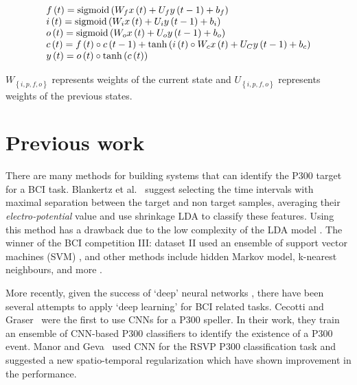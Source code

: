 \documentclass[
12pt, %
english, %
doublespacing, %
headsepline, %
]{MastersDoctoralThesis} %
\begin{document}
\begin{equation} \label{eq_lstm}
\begin{array}{l}
f\left( t \right) = {\rm{sigmoid}}\left( {{W_f}x\left( t \right) + {U_f}y\left( {t - 1} \right) + {b_f}} \right)\\
i\left( t \right) = {\rm{sigmoid}}\left( {{W_i}x\left( t \right) + {U_i}y\left( {t - 1} \right) + {b_i}} \right)\\
o\left( t \right) = {\rm{sigmoid}}\left( {{W_o}x\left( t \right) + {U_o}y\left( {t - 1} \right) + {b_o}} \right)\\
c\left( t \right) = f\left( t \right) \circ c\left( {t - 1} \right) + \tanh \left( {i\left( t \right) \circ {W_c}x\left( t \right) + {U_C}y\left( {t - 1} \right) + {b_c}} \right)\\
y\left( t \right) = o\left( t \right) \circ \tanh \left( {c\left( t \right)} \right)
\end{array}
\end{equation}

${W_{\left\{ {i,p,f,o} \right\}}}$ represents weights of the current state and  ${U_{\left\{ {i,p,f,o} \right\}}}$ represents weights of the previous states. 


\chapter{Previous work}
There are many methods for building systems that can identify the P300 target for a BCI task. Blankertz et al.~\cite{P300_Tutorial} suggest 
selecting the time intervals with maximal separation between the target and non target samples, averaging their \textit{electro-potential} value and use shrinkage LDA to classify these features. Using this method has a drawback due to the low complexity of the LDA model \cite{cincotti2003comparison}. The winner of the BCI competition III: dataset II used an ensemble of support vector machines (SVM) \cite{P300SVMWinner}, and other methods include hidden Markov model, k-nearest neighbours, and more  \cite{cincotti2003comparison}.

More recently, given the success of `deep' neural networks \cite{krizhevsky2012imagenet}, there have been several attempts to apply `deep learning' for BCI related tasks. Cecotti and Graser~\cite{P300_CNN} were the first to use CNNs  for a P300 speller. In their work, they train an ensemble of CNN-based P300 classifiers to identify the existence of a P300 event. Manor and Geva~\cite{RSVP_P300_geva} used CNN for the RSVP P300 classification task and suggested a new spatio-temporal regularization which have shown improvement in the performance.
\end{document}
